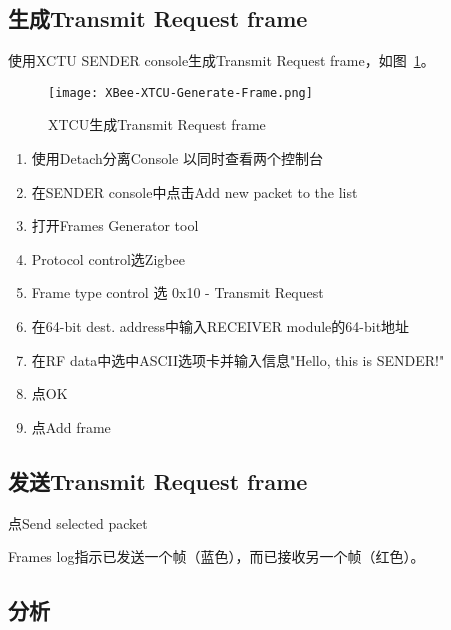\subsection{生成Transmit Request frame}

使用XCTU SENDER console生成Transmit Request frame，如图~\ref{fig:XBee-XTCU-Generate-Frame}。

\begin{figure}[htbp]
    \centering
    \texttt{[image: XBee-XTCU-Generate-Frame.png]}
    \caption{XTCU生成Transmit Request frame}
    \label{fig:XBee-XTCU-Generate-Frame}
\end{figure}

\begin{enumerate}
    \item 使用Detach分离Console 以同时查看两个控制台
    \item 在SENDER console中点击Add new packet to the list
    \item 打开Frames Generator tool
    \item Protocol control选Zigbee
    \item Frame type control 选 0x10 - Transmit Request
    \item 在64-bit dest. address中输入RECEIVER module的64-bit地址
    \item 在RF data中选中ASCII选项卡并输入信息"Hello, this is SENDER!"
    \item 点OK
    \item 点Add frame
\end{enumerate}

\subsection{发送Transmit Request frame}

点Send selected packet

Frames log指示已发送一个帧（蓝色），而已接收另一个帧（红色）。

\subsection{分析}

